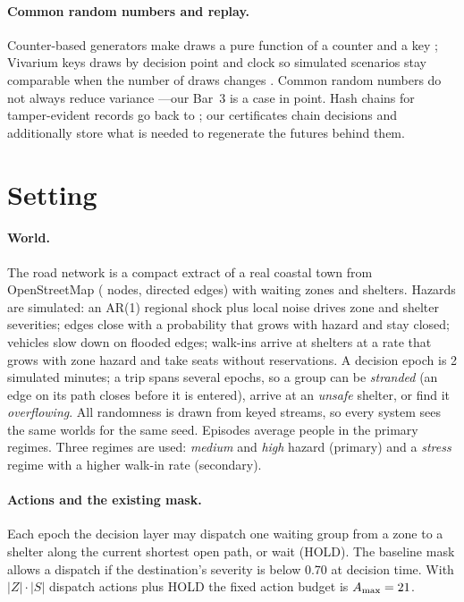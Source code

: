 \documentclass[letterpaper]{article}
\begin{document}
\paragraph{Common random numbers and replay.} Counter-based generators make draws a pure function of a
counter and a key \citep{salmon2011random123}; Vivarium keys draws by decision point and clock so
simulated scenarios stay comparable when the number of draws changes \citep{vivarium_crn}. Common random
numbers do not always reduce variance \citep{wright1979crn}---our Bar~3 is a case in point. Hash chains
for tamper-evident records go back to \citet{haber1991timestamp}; our certificates chain decisions and
additionally store what is needed to regenerate the futures behind them.

\section{Setting}

\paragraph{World.} The road network is a compact extract of a real coastal town from OpenStreetMap
\citep{osm} (\nGraphNodes{} nodes, \nGraphEdges{} directed edges) with \nZones{} waiting zones and
\nShelters{} shelters. Hazards are simulated: an AR(1) regional shock plus local noise drives zone and
shelter severities; edges close with a probability that grows with hazard and stay closed; vehicles slow
down on flooded edges; walk-ins arrive at shelters at a rate that grows with zone hazard and take seats
without reservations. A decision epoch is 2 simulated minutes; a trip spans several epochs, so a group
can be \emph{stranded} (an edge on its path closes before it is entered), arrive at an \emph{unsafe}
shelter, or find it \emph{overflowing}. All randomness is drawn from keyed streams, so every system sees
the same worlds for the same seed. Episodes average \nInitPop{} people in the primary regimes. Three
regimes are used: \emph{medium} and \emph{high} hazard (primary) and a \emph{stress} regime with a higher
walk-in rate (secondary).

\paragraph{Actions and the existing mask.} Each epoch the decision layer may dispatch one waiting group
from a zone to a shelter along the current shortest open path, or wait (HOLD). The baseline mask allows a
dispatch if the destination's severity is below 0.70 at decision time. With $|Z|\cdot|S|$ dispatch
actions plus HOLD the fixed action budget is $A_{\max}=21$.
\end{document}
